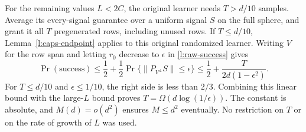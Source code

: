 For the remaining values \(L<2C\), the original learner needs
\(T>d/10\) samples. Average its every-signal guarantee over a
uniform signal \(S\) on the full sphere, and grant it all \(T\)
pregenerated rows, including unused rows. If \(T\le d/10\),
Lemma~\ref{l:caps-endpoint} applies to this original randomized
learner. Writing \(V\) for the row span and letting \(r_0\)
decrease to \(\epsilon\) in \eqref{l:raw-success} gives
\begin{equation}\label{l:maxscore:reflection}
 \Pr(\text{success})
 \le\frac12+\frac12\Pr\{\|P_{V^\perp}S\|\le\epsilon\}
 \le\frac12+\frac{T}{2d(1-\epsilon^2)}.
\end{equation}
For \(T\le d/10\) and \(\epsilon\le1/10\), the right side is
less than \(2/3\).  Combining this linear bound with the large-\(L\)
bound proves \(T=\Omega(d\log(1/\epsilon))\).
The constant is absolute, and \(M(d)=o(d^2)\) ensures \(M\le d^2\)
eventually.  No restriction on \(T\) or on the rate of growth of \(L\)
was used.
